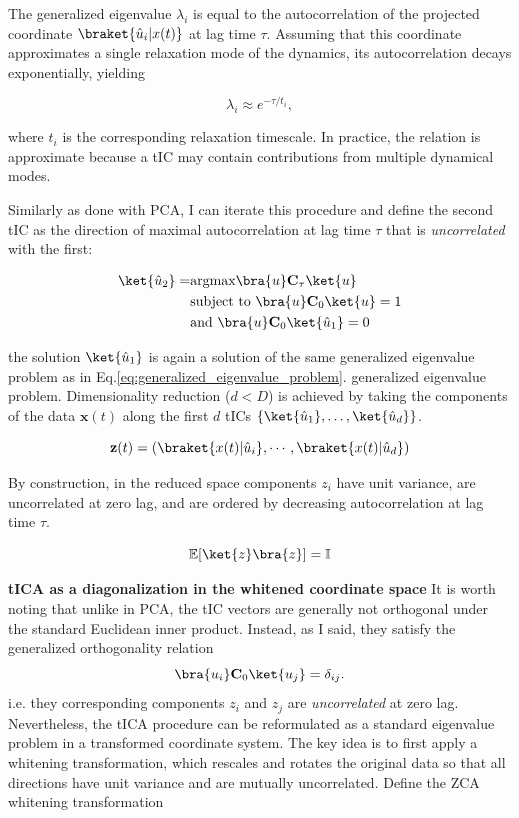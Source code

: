 The generalized eigenvalue $\lambda_i$ is equal to the autocorrelation of the projected coordinate $\braket{\hat{u}_i|x(t)}$ at lag time $\tau$. Assuming that this coordinate approximates a single relaxation mode of the dynamics, its autocorrelation decays exponentially, yielding

\begin{equation}
    \label{eq:eigvals_and_timescales}
    \lambda_i \approx e^{-\tau/t_i},
\end{equation}

where $t_i$ is the corresponding relaxation timescale. In practice, the relation is approximate because a tIC may contain contributions from multiple dynamical modes.

Similarly as done with PCA, I can iterate this procedure and define the second tIC as the direction of maximal autocorrelation at lag time $\tau$ that is \textit{uncorrelated} with the first:


\begin{align}
\ket{\hat{u}_2} = &\text{argmax} \bra{u}\mathbf{C}_{\tau}\ket{u} \notag \\
&\text{subject to}  \,\, \bra{u}\mathbf{C}_{0}\ket{u} = 1 \notag \\
&\text{and}   \,\, \bra{u}\mathbf{C}_{0}\ket{\hat{u}_1} = 0
\end{align}

the solution $\ket{\hat{u}_1}$ is again a solution of the same generalized eigenvalue problem as in Eq.\eqref{eq:generalized_eigenvalue_problem}.
generalized eigenvalue problem.
Dimensionality reduction ($d < D$) is achieved by taking the components of the data $\mathbf{x}(t)$ along the first $d$ tICs $\{\ket{\hat{u}_1}, \ldots, \ket{\hat{u}_d}\}$.

\begin{equation}
    \mathbf{z}(t) = (\braket{x(t) | \hat{u}_i}, \cdots, \braket{x(t) | \hat{u}_d})
\end{equation}

By construction, in the reduced space components $z_i$ have unit variance, are uncorrelated at zero lag,  and are ordered by decreasing autocorrelation at lag time $\tau$.

\begin{equation}
    \label{eq:original_tica}
 \mathbb{E}\!\left[\ket{z}\bra{z}\right] = \mathbb{I}
\end{equation}

\vspace{1em}


\noindent \textbf{tICA as a diagonalization in the whitened coordinate space}
It is worth noting that unlike in PCA, the tIC vectors are generally not orthogonal under the standard Euclidean inner product. Instead, as I said, they satisfy the generalized orthogonality relation
$$
\bra{u_i}\mathbf C_0\ket{u_j}=\delta_{ij}.
$$
i.e. they corresponding components $z_i$ and $z_j$ are \textit{uncorrelated} at zero lag. Nevertheless, the tICA procedure can be reformulated as a standard eigenvalue problem in a transformed coordinate system. The key idea is to first apply a whitening transformation, which rescales and rotates the original data so that all directions have unit variance and are mutually uncorrelated. Define the ZCA whitening transformation

